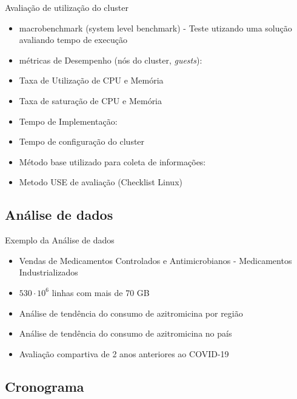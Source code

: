\documentclass[10pt,brazil]{beamer}
\theoremstyle{definition}
\begin{document}
\begin{frame}[allowframebreaks]{Avaliação de utilização do cluster}
  
  \begin{itemize}
      \item macrobenchmark (system level benchmark) - Teste utizando uma solução avaliando tempo de execução
      \item[] métricas de Desempenho (nós do cluster, \emph{guests}):
      \item Taxa de Utilização de CPU e Memória 
      \item Taxa de saturação de CPU e Memória
      \item[] Tempo de Implementação:
      \item Tempo de configuração do cluster
      \item[] Método base utilizado para coleta de informações:
      \item Metodo USE de avaliação (Checklist Linux)
  \end{itemize}
\end{frame}


\subsection{Análise de dados}

\begin{frame}{Exemplo da Análise de dados}
  \begin{itemize}
    \item Vendas de Medicamentos Controlados e Antimicrobianos - Medicamentos Industrializados
    \item $530 \cdot 10^{6}$ linhas com mais de 70 GB
    \item Análise de tendência do consumo de azitromicina por região
    \item Análise de tendência do consumo de azitromicina no país
    \item Avaliação compartiva de 2 anos anteriores ao COVID-19
  \end{itemize}
\end{frame}

\subsection{Cronograma}
\end{document}
